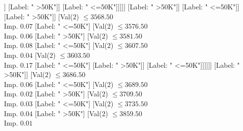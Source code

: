 \documentclass[margin=10pt]{standalone}
\begin{document}
\begin{forest}
																																	[Val($2$) $ \leq 3464.50$ \\ Imp. $0.08$
																																		[Label: " <=50K"]
																																		[Val($2$) $ \leq 3465.50$ \\ Imp. $0.14$
																																			[Label: " >50K"]
																																			[Val($2$) $ \leq 3485.50$ \\ Imp. $0.09$
																																				[Val($2$) $ \leq 3474.50$ \\ Imp. $0.13$
																																					[Val($2$) $ \leq 3468.50$ \\ Imp. $0.31$
																																						[Label: " >50K"]
																																						[Label: " <=50K"]]
																																					[Label: " >50K"]]
																																				[Label: " <=50K"]]]]]
																																[Label: " >50K"]]
																															[Label: " <=50K"]]
																														[Label: " >50K"]]
																													[Val($2$) $ \leq 3568.50$ \\ Imp. $0.07$
																														[Label: " <=50K"]
																														[Val($2$) $ \leq 3576.50$ \\ Imp. $0.06$
																															[Label: " >50K"]
																															[Val($2$) $ \leq 3581.50$ \\ Imp. $0.08$
																																[Label: " <=50K"]
																																[Val($2$) $ \leq 3607.50$ \\ Imp. $0.04$
																																	[Val($2$) $ \leq 3603.50$ \\ Imp. $0.17$
																																		[Label: " <=50K"]
																																		[Label: " >50K"]]
																																	[Label: " <=50K"]]]]]]
																												[Label: " >50K"]]
																											[Val($2$) $ \leq 3686.50$ \\ Imp. $0.06$
																												[Label: " <=50K"]
																												[Val($2$) $ \leq 3689.50$ \\ Imp. $0.02$
																													[Label: " >50K"]
																													[Val($2$) $ \leq 3709.50$ \\ Imp. $0.03$
																														[Label: " <=50K"]
																														[Val($2$) $ \leq 3735.50$ \\ Imp. $0.04$
																															[Label: " >50K"]
																															[Val($2$) $ \leq 3859.50$ \\ Imp. $0.01$

\end{forest}
\end{document}
